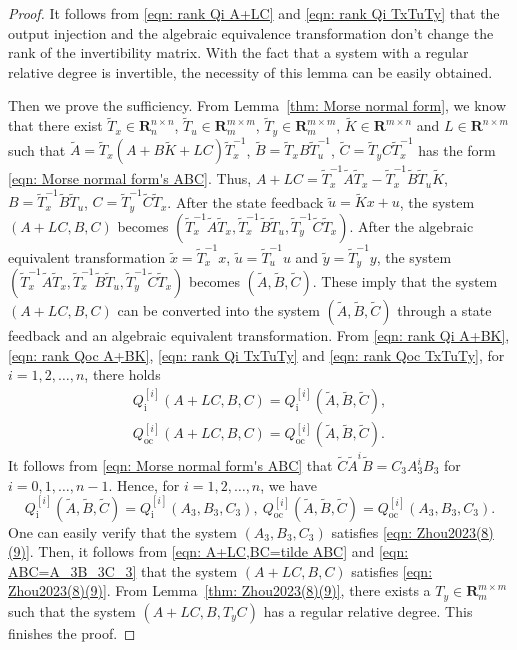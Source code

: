\documentclass[sort&compress]{elsarticle}
\newcommand\Qi{Q_\mathrm i}
\newcommand\Qoc{Q_\mathrm{oc}}
\newcommand\R{\mathbf R}
\begin{document}
{\renewcommand\proofname{Proof for
  \Cref{thm: invertible and Morse form}}
\begin{proof}
It follows from \eqref{eqn: rank Qi A+LC} and \eqref{eqn: rank Qi TxTuTy} that
the output injection and the algebraic equivalence transformation don't change the rank of the invertibility matrix.
With the fact that a system with a regular relative degree is invertible,
the necessity of this lemma can be easily obtained.

Then we prove the sufficiency.
From Lemma~\ref{thm: Morse normal form}, we know that there exist
$\tilde T_x\in\R^{n\times n}_n$,
$\tilde T_u\in\R^{m\times m}_m$,
$\tilde T_y\in\R^{m\times m}_m$,
$\tilde K\in\R^{m\times n}$ and
$L\in\R^{n\times m}$ such that
$\tilde A=\tilde T_x(A+B\tilde K+LC)\tilde T_x^{-1}$,
$\tilde B=\tilde T_xB\tilde T_u^{-1}$,
$\tilde C=\tilde T_yC\tilde T_x^{-1}$
has the form \eqref{eqn: Morse normal form's ABC}.
Thus, $A+LC=\tilde T_x^{-1}\tilde A\tilde T_x
-\tilde T_x^{-1}\tilde B\tilde T_u\tilde K$,
$B=\tilde T_x^{-1}\tilde B\tilde T_u$,
$C=\tilde T_y^{-1}\tilde C\tilde T_x$.
After the state feedback $\tilde u=\tilde Kx+u$, the system
$(A+LC,B,C)$
becomes $(\tilde T_x^{-1}\tilde A\tilde T_x,
\tilde T_x^{-1}\tilde B\tilde T_u,
\tilde T_y^{-1}\tilde C\tilde T_x)$.
After the algebraic equivalent transformation $\tilde x=\tilde T_x^{-1}x$,
$\tilde u=\tilde T_u^{-1}u$ and $\tilde y=\tilde T_y^{-1}y$,
the system $(\tilde T_x^{-1}\tilde A\tilde T_x,
\tilde T_x^{-1}\tilde B\tilde T_u,
\tilde T_y^{-1}\tilde C\tilde T_x)$ becomes $(\tilde A,\tilde B,\tilde C)$.
These imply that the system $(A+LC,B,C)$ can be converted into the system
$(\tilde A,\tilde B,\tilde C)$ through a state feedback and an algebraic equivalent transformation.
From \eqref{eqn: rank Qi A+BK}, \eqref{eqn: rank Qoc A+BK},
\eqref{eqn: rank Qi TxTuTy} and \eqref{eqn: rank Qoc TxTuTy},
for $i=1,2,\dots,n$, there holds
\begin{equation}\label{eqn: A+LC,BC=tilde ABC}
\begin{gathered}
\Qi^{[i]}(A+LC,B,C)=\Qi^{[i]}(\tilde A,\tilde B,\tilde C),\\
\Qoc^{[i]}(A+LC,B,C)=\Qoc^{[i]}(\tilde A,\tilde B,\tilde C).
\end{gathered}
\end{equation}
It follows from \eqref{eqn: Morse normal form's ABC} that
$\tilde C\tilde A^i\tilde B=C_3A_3^iB_3$ for $i=0,1,\dots,n-1$.
Hence, for $i=1,2,\dots,n$, we have
\begin{equation}\label{eqn: ABC=A_3B_3C_3}
\Qi^{[i]}(\tilde A,\tilde B,\tilde C)=\Qi^{[i]}(A_3,B_3,C_3),\
\Qoc^{[i]}(\tilde A,\tilde B,\tilde C)=\Qoc^{[i]}(A_3,B_3,C_3).
\end{equation}
One can easily verify that the system $(A_3,B_3,C_3)$ satisfies
\eqref{eqn: Zhou2023(8)(9)}.
Then, it follows from \eqref{eqn: A+LC,BC=tilde ABC} and \eqref{eqn: ABC=A_3B_3C_3} that
the system $(A+LC,B,C)$ satisfies \eqref{eqn: Zhou2023(8)(9)}.
From Lemma~\ref{thm: Zhou2023(8)(9)},
there exists a $T_y\in\R^{m\times m}_m$ such that the system
$(A+LC,B,T_yC)$ has a regular relative degree.
This finishes the proof.
\end{proof}}
\end{document}
